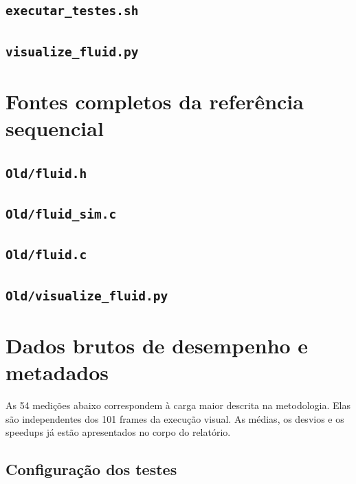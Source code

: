 \documentclass[12pt,a4paper]{article}
\begin{document}
\subsection{\texttt{executar\_testes.sh}}

\clearpage
\subsection{\texttt{visualize\_fluid.py}}


\clearpage
\section{Fontes completos da referência sequencial}
\subsection{\texttt{Old/fluid.h}}

\clearpage
\subsection{\texttt{Old/fluid\_sim.c}}

\clearpage
\subsection{\texttt{Old/fluid.c}}

\clearpage
\subsection{\texttt{Old/visualize\_fluid.py}}


\clearpage
\section{Dados brutos de desempenho e metadados}
As 54 medições abaixo correspondem à carga maior descrita na metodologia. Elas são independentes dos 101 frames da execução visual. As médias, os desvios e os speedups já estão apresentados no corpo do relatório.

\subsection{Configuração dos testes}

\end{document}
